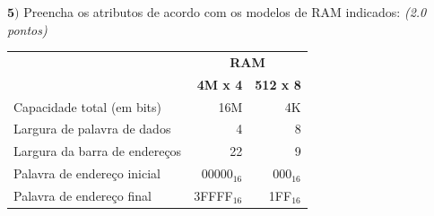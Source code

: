 \documentclass[12pt]{article}
\newcommand{\exerc}[3]{ \vspace*{25pt} {$\mathbf{#1)}$} #2 \hfill {\it #3} }
\begin{document}
\vspace{-15pt}

\exerc{5}{Preencha os atributos de acordo com os modelos de RAM indicados:}{(2.0 pontos)}
\\
\begin{center}
\begin{tabular}{|l|r|r|}
 \cline{2-3}
 \multicolumn{1}{c|}{} & \multicolumn{2}{c|}{\bf RAM} \\ \cline{2-3}
 \multicolumn{1}{c|}{} & {\bf 4M x 4} & {\bf 512 x 8} \\ \hline
 Capacidade total (em bits) & 16M & 4K \\ \hline
 Largura de palavra de dados & 4 & 8 \\ \hline
 Largura da barra de endereços & 22 & 9 \\ \hline
 Palavra de endereço inicial & 00000$_{16}$ & 000$_{16}$ \\ \hline
 Palavra de endereço final & 3FFFF$_{16}$ & 1FF$_{16}$ \\ \hline
\end{tabular}
\end{center}
\end{document}
